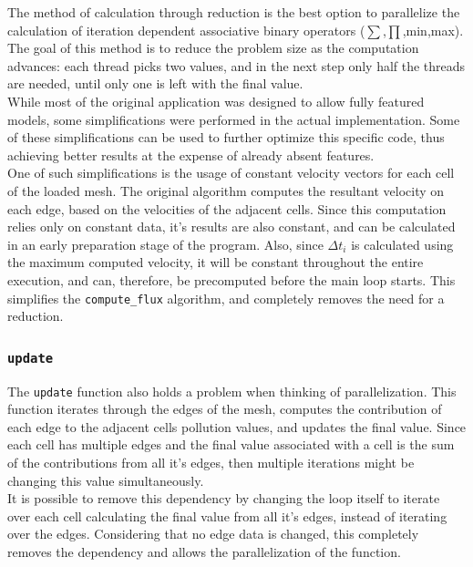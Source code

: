 \documentclass[9pt,twocolumn]{scrartcl}
\begin{document}
The method of calculation through reduction is the best option to parallelize the calculation of iteration dependent associative binary operators ($\sum$,$\prod$,min,max). The goal of this method is to reduce the problem size as the computation advances: each thread picks two values, and in the next step only half the threads are needed, until only one is left with the final value.\\

While most of the original application was designed to allow fully featured models, some simplifications were performed in the actual implementation. Some of these simplifications can be used to further optimize this specific code, thus achieving better results at the expense of already absent features.\\

One of such simplifications is the usage of constant velocity vectors for each cell of the loaded mesh. The original algorithm computes the resultant velocity on each edge, based on the velocities of the adjacent cells. Since this computation relies only on constant data, it's results are also constant, and can be calculated in an early preparation stage of the program. Also, since $\Delta t_{i}$ is calculated using the maximum computed velocity, it will be constant throughout the entire execution, and can, therefore, be precomputed before the main loop starts. This simplifies the \texttt{compute\_flux} algorithm, and completely removes the need for a reduction.\\

\subsubsection{\texttt{update}}
The \texttt{update} function also holds a problem when thinking of parallelization. This function iterates through the edges of the mesh, computes the contribution of each edge to the adjacent cells pollution values, and updates the final value. Since each cell has multiple edges and the final value associated with a cell is the sum of the contributions from all it's edges, then multiple iterations might be changing this value simultaneously.\\

It is possible to remove this dependency by changing the loop itself to iterate over each cell calculating the final value from all it's edges, instead of iterating over the edges. Considering that no edge data is changed, this completely removes the dependency and allows the parallelization of the function.\\
\end{document}
